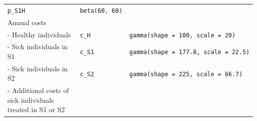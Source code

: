 \documentclass[]{book}
\begin{document}
\begin{longtable}[]{@{}lll@{}}
\begin{minipage}[t]{0.13\columnwidth}
\texttt{p\_S1H}\strut
\end{minipage} & \begin{minipage}[t]{0.46\columnwidth}\raggedright
\texttt{beta(60,\ 60)}\strut
\end{minipage}\tabularnewline
\begin{minipage}[t]{0.33\columnwidth}\raggedright
Annual costs\strut
\end{minipage} & \begin{minipage}[t]{0.13\columnwidth}\raggedright
\strut
\end{minipage} & \begin{minipage}[t]{0.46\columnwidth}\raggedright
\strut
\end{minipage}\tabularnewline
\begin{minipage}[t]{0.33\columnwidth}\raggedright
- Healthy individuals\strut
\end{minipage} & \begin{minipage}[t]{0.13\columnwidth}\raggedright
\texttt{c\_H}\strut
\end{minipage} & \begin{minipage}[t]{0.46\columnwidth}\raggedright
\texttt{gamma(shape\ =\ 100,\ scale\ =\ 20)}\strut
\end{minipage}\tabularnewline
\begin{minipage}[t]{0.33\columnwidth}\raggedright
- Sick individuals in S1\strut
\end{minipage} & \begin{minipage}[t]{0.13\columnwidth}\raggedright
\texttt{c\_S1}\strut
\end{minipage} & \begin{minipage}[t]{0.46\columnwidth}\raggedright
\texttt{gamma(shape\ =\ 177.8,\ scale\ =\ 22.5)}\strut
\end{minipage}\tabularnewline
\begin{minipage}[t]{0.33\columnwidth}\raggedright
- Sick individuals in S2\strut
\end{minipage} & \begin{minipage}[t]{0.13\columnwidth}\raggedright
\texttt{c\_S2}\strut
\end{minipage} & \begin{minipage}[t]{0.46\columnwidth}\raggedright
\texttt{gamma(shape\ =\ 225,\ scale\ =\ 66.7)}\strut
\end{minipage}\tabularnewline
\begin{minipage}[t]{0.33\columnwidth}\raggedright
- Additional costs of sick individuals treated in S1 or S2\strut
\end{minipage} & \begin{minipage}[t]{0.13\columnwidth}\raggedright

\end{minipage}
\end{longtable}
\end{document}
